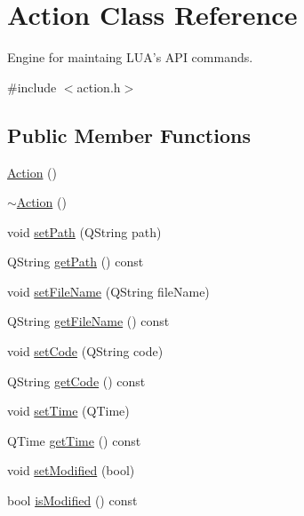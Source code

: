 \hypertarget{class_action}{\section{Action Class Reference}
\label{class_action}
}


Engine for maintaing L\-U\-A's A\-P\-I commands.  




{\ttfamily \#include $<$action.\-h$>$}

\subsection*{Public Member Functions}
\begin{DoxyCompactItemize}
\item 
\hyperlink{class_action_a4f457ccfc8336b565cadca56b36e0271}{Action} ()
\item 
\hyperlink{class_action_acdb06775d157339256a8ecd55749226c}{$\sim$\-Action} ()
\item 
void \hyperlink{class_action_a8d7527963d293e66cd9d63e4868f07a4}{set\-Path} (Q\-String path)
\item 
Q\-String \hyperlink{class_action_aae0058c4c9a79b296b1ef89670da4167}{get\-Path} () const 
\item 
void \hyperlink{class_action_a5d60106a1c5b9d492f32432e903ba0c4}{set\-File\-Name} (Q\-String file\-Name)
\item 
Q\-String \hyperlink{class_action_a6fe79539f83f2af7be05b698dae55d65}{get\-File\-Name} () const 
\item 
void \hyperlink{class_action_a534682646596250cd8bb98957e423791}{set\-Code} (Q\-String code)
\item 
Q\-String \hyperlink{class_action_a0cb6822da346dff4514e056547979cdd}{get\-Code} () const 
\item 
void \hyperlink{class_action_a78038e8c66cf8e6b4ff53874298ef7d4}{set\-Time} (Q\-Time)
\item 
Q\-Time \hyperlink{class_action_a01e6fdaabad6d3794f34a6c74b484095}{get\-Time} () const 
\item 
void \hyperlink{class_action_ab3d4f6defc4b25b7d64d806ca861388d}{set\-Modified} (bool)
\item 
bool \hyperlink{class_action_a50c6caabd07584a1d4adb8dfc6270abe}{is\-Modified} () const 
\end{DoxyCompactItemize}
